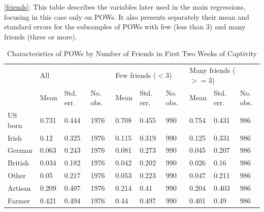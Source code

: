 \documentclass[a4paper]{report}\usepackage{graphicx, color}
\begin{document}
\begin{refsection}
\autoref{friends}: This table describes the variables later used in the main regressions, focusing in this case only on POWs.  It also presents separately their mean and standard errors for the subsamples of POWs with few (less than 3) and many friends (three or more). 

\begin{table}
\caption{Characteristics of POWs by Number of Friends in First Two Weeks of Captivity}
\label{friends}
\begin{tabular}{llllllllll}

                                  & \multicolumn{3}{l}{All} & \multicolumn{3}{l}{Few friends ($<3$)} & \multicolumn{3}{l}{Many friends ($>=3$)} \\
                                  & Mean                    & Std. err.                            & No. obs.                               & Mean & Std. err. & No. obs. & Mean & Std. err. & No. obs. \\
US born                           & 0.731                   & 0.444                                & 1976                                   & 0.708 & 0.455 & 990 & 0.754 & 0.431 & 986 \\
Irish                             & 0.12                    & 0.325                                & 1976                                   & 0.115 & 0.319 & 990 & 0.125 & 0.331 & 986 \\
German                            & 0.063                   & 0.243                                & 1976                                   & 0.081 & 0.273 & 990 & 0.045 & 0.207 & 986 \\
British                           & 0.034                   & 0.182                                & 1976                                   & 0.042 & 0.202 & 990 & 0.026 & 0.16 & 986 \\
Other                             & 0.05                    & 0.217                                & 1976                                   & 0.053 & 0.223 & 990 & 0.047 & 0.211 & 986 \\
Artisan                           & 0.209                   & 0.407                                & 1976                                   & 0.214 & 0.41 & 990 & 0.204 & 0.403 & 986 \\
Farmer                            & 0.421                   & 0.494                                & 1976                                   & 0.44 & 0.497 & 990 & 0.401 & 0.49 & 986 \\

\end{tabular}
\end{table}
\end{refsection}
\end{document}
